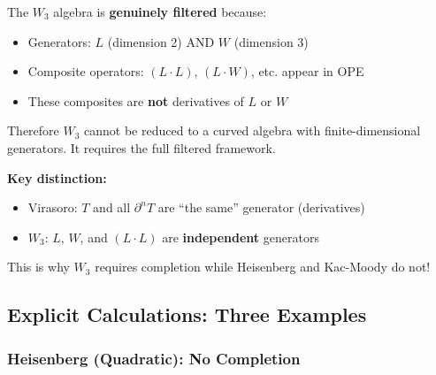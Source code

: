 \begin{example}\label{ex:w3-not-curved}
The $W_3$ algebra is \textbf{genuinely filtered} because:
\begin{itemize}
\item Generators: $L$ (dimension 2) AND $W$ (dimension 3)
\item Composite operators: $(L \cdot L)$, $(L \cdot W)$, etc. appear in OPE
\item These composites are \textbf{not} derivatives of $L$ or $W$
\end{itemize}

Therefore $W_3$ cannot be reduced to a curved algebra with finite-dimensional generators. 
It requires the full filtered framework.

\textbf{Key distinction:}
\begin{itemize}
\item Virasoro: $T$ and all $\partial^n T$ are ``the same'' generator (derivatives)
\item $W_3$: $L$, $W$, and $(L \cdot L)$ are \textbf{independent} generators
\end{itemize}

This is why $W_3$ requires completion while Heisenberg and Kac-Moody do not!
\end{example}

\subsection{Explicit Calculations: Three Examples}

\subsubsection{Heisenberg (Quadratic): No Completion}

